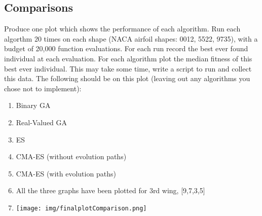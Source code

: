 \documentclass{article}
\begin{document}
\newpage
\subsection{Comparisons}
Produce one plot which shows the performance of each algorithm. Run each algorthm 20 times on each shape (NACA airfoil shapes: 0012, 5522, 9735), with a budget of 20,000 function evaluations. For each run record the best ever found individual at each evaluation. For each algorithm plot the median fitness of this best ever individual. This may take some time, write a script to run and collect this data. The following should be on this plot (leaving out any algorithms you chose not to implement):
\begin{enumerate}
	\item Binary GA
	\item Real-Valued GA
	\item ES
	\item CMA-ES (without evolution paths)
	\item CMA-ES (with evolution paths)
	\item \color{blue}All the three graphs have been plotted for 3rd wing, [9,7,3,5]
	\item
	\texttt{[image: img/finalplotComparison.png]}
\end{enumerate}
\end{document}
